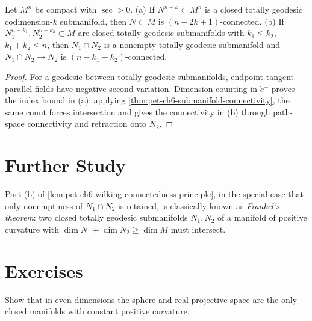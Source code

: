 \begin{lemma}
  \label{lem:pet-ch6-wilking-connectedness-principle}
  Let $M^n$ be compact with $\sec>0$. (a) If $N^{n-k}\subset M^n$ is a closed
  totally geodesic codimension-$k$ submanifold, then $N\subset M$ is
  $(n-2k+1)$-connected. (b) If $N_1^{n-k_1},N_2^{n-k_2}\subset M$ are closed
  totally geodesic submanifolds with $k_1\le k_2$, $k_1+k_2\le n$, then
  $N_1\cap N_2$ is a nonempty totally geodesic submanifold and
  $N_1\cap N_2\to N_2$ is $(n-k_1-k_2)$-connected.
\end{lemma}
\begin{proof}
  \sketch
  For a geodesic between totally geodesic submanifolds, endpoint-tangent parallel fields have negative second variation. Dimension counting in \(\dot c^\perp\) proves the index bound in (a); applying \cref{thm:pet-ch6-submanifold-connectivity}, the same count forces intersection and gives the connectivity in (b) through path-space connectivity and retraction onto \(N_2\).
\end{proof}

\section{Further Study}

\begin{remark}
  \label{rem:pet-ch6-frankel-theorem}
  Part (b) of \cref{lem:pet-ch6-wilking-connectedness-principle}, in the
  special case that only nonemptiness of $N_1\cap N_2$ is retained, is
  classically known as \emph{Frankel's theorem}: two closed totally geodesic
  submanifolds $N_1,N_2$ of a manifold of positive curvature with
  $\dim N_1+\dim N_2\ge\dim M$ must intersect.
\end{remark}

\section{Exercises}

\begin{remark}
  \label{rem:pet-ch6-ex-6-7-1}
  Show that in even dimensions the sphere and real projective space are the
  only closed manifolds with constant positive curvature.
\end{remark}

